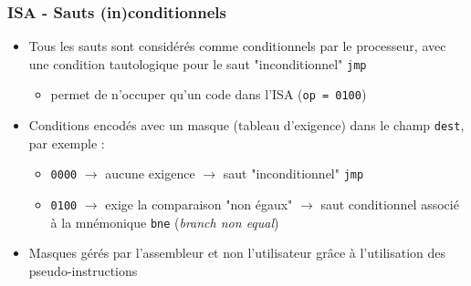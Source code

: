 \documentclass{beamer}
\begin{document}
\begin{frame}
\frametitle{ISA - Sauts (in)conditionnels}
\begin{itemize}
\item Tous les sauts sont considérés comme conditionnels par le processeur, avec
    une condition tautologique pour le saut "inconditionnel" \texttt{jmp}
    \begin{itemize}
    \item permet de n'occuper qu'un code dans l'ISA (\texttt{op = 0100})
    \end{itemize}
\item Conditions encodés avec un masque (tableau d'exigence) dans le champ
    \texttt{dest}, par exemple :
    \begin{itemize}
    \item \texttt{0000} $\rightarrow$ aucune exigence $\rightarrow$ saut
        "inconditionnel" \texttt{jmp}
    \item \texttt{0100} $\rightarrow$ exige la comparaison "non égaux"
        $\rightarrow$ saut conditionnel associé à la mnémonique \texttt{bne}
        (\textit{branch non equal})
    \end{itemize}
\item Masques gérés par l'assembleur et non l'utilisateur grâce à l'utilisation
    des pseudo-instructions
\end{itemize}
\end{frame}
\end{document}
